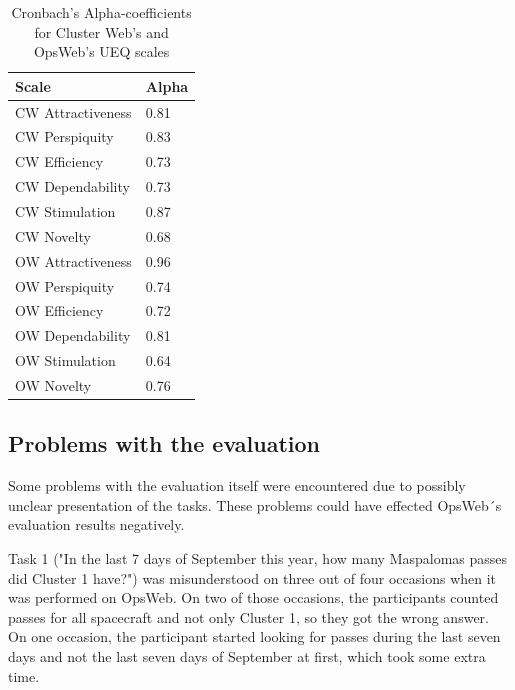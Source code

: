 \begin{table}[!ht]
\def\arraystretch{1.1}%
    \begin{center}
    \caption{Cronbach's Alpha-coefficients for Cluster Web's and OpsWeb's UEQ scales}
    \label{alpha_coeff}
    \begin{tabular}{| l | l | }
    \hline
    Scale & Alpha  \\
    \hline
    CW Attractiveness    & 0.81       \\
    CW Perspiquity    & 0.83        \\
    CW Efficiency    & 0.73        \\
    CW Dependability    & 0.73        \\
    CW Stimulation    & 0.87        \\
    CW Novelty    & 0.68        \\
    \hline
    OW Attractiveness    & 0.96        \\
    OW Perspiquity    & 0.74        \\
    OW Efficiency    & 0.72        \\
    OW Dependability    & 0.81        \\
    OW Stimulation    & 0.64        \\
    OW Novelty    & 0.76        \\
    \hline
    \end{tabular}
    \end{center}
\end{table}

\subsection{Problems with the evaluation} \label{evaluation_problems}
Some problems with the evaluation itself were encountered due to possibly unclear presentation of the tasks. These problems could have effected OpsWeb´s evaluation results negatively.

Task 1 ("In the last 7 days of September this year, how many Maspalomas passes did Cluster 1 have?") was misunderstood on three out of four occasions when it was performed on OpsWeb. On two of those occasions, the participants counted passes for all spacecraft and not only Cluster 1, so they got the wrong answer. On one occasion, the participant started looking for passes during the last seven days and not the last seven days of September at first, which took some extra time.

